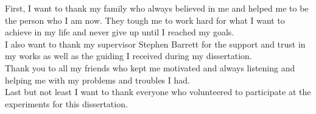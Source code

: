 First, I want to thank my family who always believed in me and helped me to be the person who I am now. 
They tough me to work hard for what I want to achieve in my life and never give up until I reached my goals. 
\\
I also want to thank my supervisor Stephen Barrett for the support and trust in my works as well as the guiding I received during my dissertation. 
\\
Thank you to all my friends who kept me motivated and always listening and helping me with my problems and troubles I had. 
\\
Last but not least I want to thank everyone who volunteered to participate at the experiments for this dissertation. 
\\


